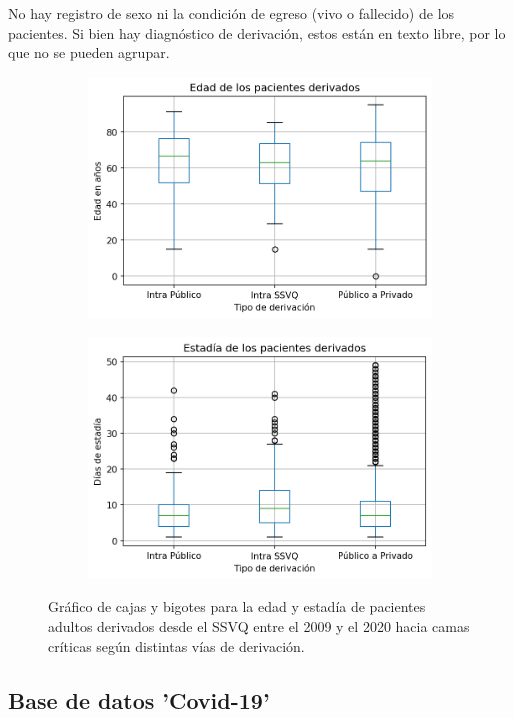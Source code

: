 \documentclass{article}
\begin{document}
No hay registro de sexo ni la condición de egreso (vivo o fallecido) de los pacientes. Si bien hay diagnóstico de derivación, estos están en texto libre, por lo que no se pueden agrupar.

\begin{figure}
	\centering
	\begin{subfigure}{.5\textwidth}
		\includegraphics[width=.8\linewidth]{./figuras/Edad_derivacion_historica.png}
	\end{subfigure}%
	\begin{subfigure}{.5\textwidth}
		\includegraphics[width=.8\linewidth]{./figuras/Estadia_derivacion_historica.png}
	\end{subfigure}
	\caption{Gráfico de cajas y bigotes para la edad y estadía de pacientes adultos derivados desde el SSVQ entre el 2009 y el 2020 hacia camas críticas según distintas vías de derivación.}
\label{fig: edadyestadia_derivaciones}
\end{figure}



\subsection{Base de datos 'Covid-19'}
\end{document}

